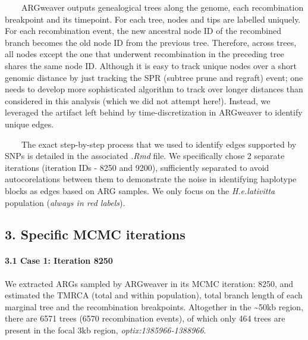 \documentclass[
]{article}
\begin{document}
  ARGweaver outputs genealogical trees along the genome, each
recombination breakpoint and its timepoint. For each tree, nodes and
tips are labelled uniquely. For each recombination event, the new
ancestral node ID of the recombined branch becomes the old node ID from
the previous tree. Therefore, across trees, all nodes except the one
that underwent recombination in the preceding tree shares the same node
ID. Although it is easy to track unique nodes over a short genomic
distance by just tracking the SPR (subtree prune and regraft) event; one
needs to develop more sophisticated algorithm to track over longer
distances than considered in this analysis (which we did not attempt
here!). Instead, we leveraged the artifact left behind by
time-discretization in ARGweaver to identify unique edges.

  The exact step-by-step process that we used to identify edges
supported by SNPs is detailed in the associated \emph{.Rmd} file. We
specifically chose 2 separate iterations (iteration IDs - 8250 and
9200), sufficiently separated to avoid autocorelations between them to
demonstrate the noise in identifying haplotype blocks as edges based on
ARG samples. We only focus on the \emph{H.e.lativitta} population
(\emph{always in red labels}).

\hypertarget{specific-mcmc-iterations}{%
\subsection{3. Specific MCMC
iterations}\label{specific-mcmc-iterations}}

\hypertarget{case-1-iteration-8250}{%
\paragraph{\texorpdfstring{3.1 Case 1: Iteration 8250\\
}{3.1 Case 1: Iteration 8250 }}\label{case-1-iteration-8250}}

\hfill\break

We extracted ARGs sampled by ARGweaver in its MCMC iteration: 8250, and
estimated the TMRCA (total and within population), total branch length
of each marginal tree and the recombination breakpoints. Altogether in
the \textasciitilde50kb region, there are 6571 trees (6570 recombination
events), of which only 464 trees are present in the focal 3kb region,
\emph{optix:1385966-1388966}.
\end{document}
